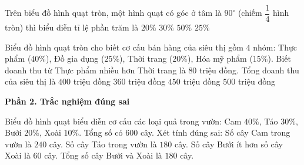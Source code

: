 \begin{ex} %
Trên biểu đồ hình quạt tròn, một hình quạt có góc ở tâm là $90^\circ$ (chiếm $\dfrac{1}{4}$ hình tròn) thì biểu diễn tỉ lệ phần trăm là
\choice
{$20\%$}
{$30\%$}
{$50\%$}
{\True $25\%$}
\end{ex}

\begin{ex} %
Biểu đồ hình quạt tròn cho biết cơ cấu bán hàng của siêu thị gồm $4$ nhóm: Thực phẩm ($40\%$), Đồ gia dụng ($25\%$), Thời trang ($20\%$), Hóa mỹ phẩm ($15\%$). Biết doanh thu từ Thực phẩm nhiều hơn Thời trang là $80$ triệu đồng. Tổng doanh thu của siêu thị là
\choice
{\True $400$ triệu đồng}
{$360$ triệu đồng}
{$450$ triệu đồng}
{$500$ triệu đồng}
\end{ex}

\textbf{Phần 2. Trắc nghiệm đúng sai}

\begin{ex} %
Biểu đồ hình quạt biểu diễn cơ cấu các loại quả trong vườn: Cam $40\%$, Táo $30\%$, Bưởi $20\%$, Xoài $10\%$. Tổng số có $600$ cây. Xét tính đúng sai:
\choiceTF
{\True Số cây Cam trong vườn là $240$ cây.}
{\True Số cây Táo trong vườn là $180$ cây.}
{Số cây Bưởi ít hơn số cây Xoài là $60$ cây.}
{\True Tổng số cây Bưởi và Xoài là $180$ cây.}
\end{ex}

